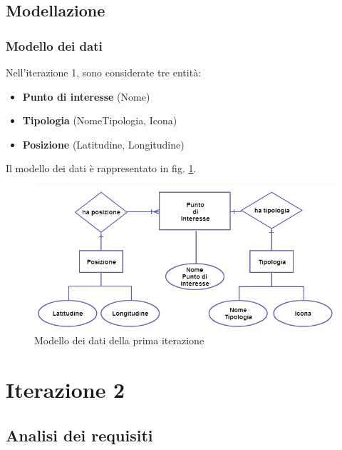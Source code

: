 \subsection{Modellazione}
\subsubsection{Modello dei dati}
Nell'iterazione 1, sono considerate tre entità:
\begin{itemize}
\item \textbf{Punto di interesse} (Nome)
\item \textbf{Tipologia} (NomeTipologia, Icona)
\item \textbf{Posizione} (Latitudine, Longitudine)
\end{itemize}
Il modello dei dati è rappresentato in fig. \ref{datamodelprimaterazione}.
\begin{figure}
\includegraphics[scale=0.55]{imgs/model/DataModelPrimaIterazione.png} 
\caption{Modello dei dati della prima iterazione\label{datamodelprimaterazione}}
\end{figure}




\clearpage

\section{Iterazione 2}

\subsection{Analisi dei requisiti}

